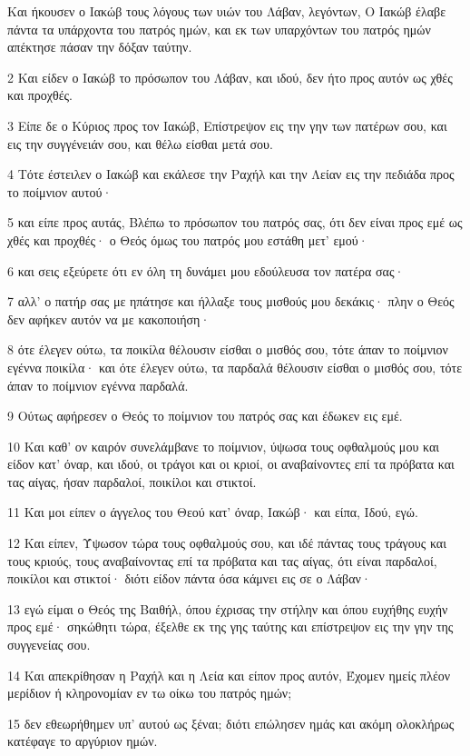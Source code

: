 \par Και ήκουσεν ο Ιακώβ τους λόγους των υιών του Λάβαν, λεγόντων, Ο Ιακώβ έλαβε πάντα τα υπάρχοντα του πατρός ημών, και εκ των υπαρχόντων του πατρός ημών απέκτησε πάσαν την δόξαν ταύτην.
\par 2 Και είδεν ο Ιακώβ το πρόσωπον του Λάβαν, και ιδού, δεν ήτο προς αυτόν ως χθές και προχθές.
\par 3 Είπε δε ο Κύριος προς τον Ιακώβ, Επίστρεψον εις την γην των πατέρων σου, και εις την συγγένειάν σου, και θέλω είσθαι μετά σου.
\par 4 Τότε έστειλεν ο Ιακώβ και εκάλεσε την Ραχήλ και την Λείαν εις την πεδιάδα προς το ποίμνιον αυτού·
\par 5 και είπε προς αυτάς, Βλέπω το πρόσωπον του πατρός σας, ότι δεν είναι προς εμέ ως χθές και προχθές· ο Θεός όμως του πατρός μου εστάθη μετ' εμού·
\par 6 και σεις εξεύρετε ότι εν όλη τη δυνάμει μου εδούλευσα τον πατέρα σας·
\par 7 αλλ' ο πατήρ σας με ηπάτησε και ήλλαξε τους μισθούς μου δεκάκις· πλην ο Θεός δεν αφήκεν αυτόν να με κακοποιήση·
\par 8 ότε έλεγεν ούτω, τα ποικίλα θέλουσιν είσθαι ο μισθός σου, τότε άπαν το ποίμνιον εγέννα ποικίλα· και ότε έλεγεν ούτω, τα παρδαλά θέλουσιν είσθαι ο μισθός σου, τότε άπαν το ποίμνιον εγέννα παρδαλά.
\par 9 Ούτως αφήρεσεν ο Θεός το ποίμνιον του πατρός σας και έδωκεν εις εμέ.
\par 10 Και καθ' ον καιρόν συνελάμβανε το ποίμνιον, ύψωσα τους οφθαλμούς μου και είδον κατ' όναρ, και ιδού, οι τράγοι και οι κριοί, οι αναβαίνοντες επί τα πρόβατα και τας αίγας, ήσαν παρδαλοί, ποικίλοι και στικτοί.
\par 11 Και μοι είπεν ο άγγελος του Θεού κατ' όναρ, Ιακώβ· και είπα, Ιδού, εγώ.
\par 12 Και είπεν, Ύψωσον τώρα τους οφθαλμούς σου, και ιδέ πάντας τους τράγους και τους κριούς, τους αναβαίνοντας επί τα πρόβατα και τας αίγας, ότι είναι παρδαλοί, ποικίλοι και στικτοί· διότι είδον πάντα όσα κάμνει εις σε ο Λάβαν·
\par 13 εγώ είμαι ο Θεός της Βαιθήλ, όπου έχρισας την στήλην και όπου ευχήθης ευχήν προς εμέ· σηκώθητι τώρα, έξελθε εκ της γης ταύτης και επίστρεψον εις την γην της συγγενείας σου.
\par 14 Και απεκρίθησαν η Ραχήλ και η Λεία και είπον προς αυτόν, Έχομεν ημείς πλέον μερίδιον ή κληρονομίαν εν τω οίκω του πατρός ημών;
\par 15 δεν εθεωρήθημεν υπ' αυτού ως ξέναι; διότι επώλησεν ημάς και ακόμη ολοκλήρως κατέφαγε το αργύριον ημών.
